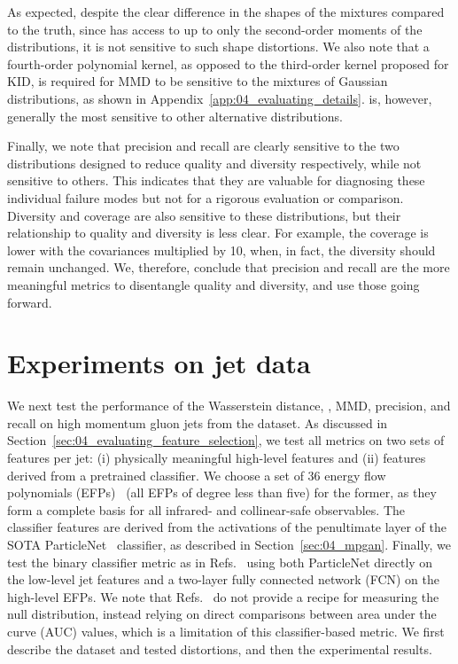 As expected, despite the clear difference in the shapes of the mixtures compared to the truth, since \fgdinf has access to up to only the second-order moments of the distributions, it is not sensitive to such shape distortions.
We also note that a fourth-order polynomial kernel, as opposed to the third-order kernel proposed for KID, is required for MMD to be sensitive to the mixtures of Gaussian distributions, as shown in Appendix~\ref{app:04_evaluating_details}.
\fgdinf is, however, generally the most sensitive to other alternative distributions.

Finally, we note that precision and recall are clearly sensitive to the two distributions designed to reduce quality and diversity respectively, while not sensitive to others.
This indicates that they are valuable for diagnosing these individual failure modes but not for a rigorous evaluation or comparison. 
Diversity and coverage are also sensitive to these distributions, but their relationship to quality and diversity is less clear.
For example, the coverage is lower with the covariances multiplied by 10, when, in fact, the diversity should remain unchanged.
We, therefore, conclude that precision and recall are the more meaningful metrics to disentangle quality and diversity, and use those going forward.

\section{Experiments on jet data}
\label{sec:04_evaluating_jetdata} 

We next test the performance of the Wasserstein distance, \fgdinf, MMD, precision, and recall on high momentum gluon jets from the \jetnet dataset.
As discussed in Section~\ref{sec:04_evaluating_feature_selection}, we test all metrics on two sets of features per jet: (i) physically meaningful high-level features and (ii) features derived from a pretrained classifier.
We choose a set of 36 energy flow polynomials (EFPs)~\cite{Komiske:2017aww} (all EFPs of degree less than five) for the former, as they form a complete basis for all infrared- and collinear-safe observables.
The classifier features are derived from the activations of the penultimate layer of the SOTA ParticleNet~\cite{Qu:2019gqs} classifier, as described in Section~\ref{sec:04_mpgan}.
Finally, we test the binary classifier metric as in Refs.~\cite{krause_caloflow, calochallenge} using both ParticleNet directly on the low-level jet features and a two-layer fully connected network (FCN) on the high-level EFPs.
We note that Refs.~\cite{krause_caloflow, calochallenge} do not provide a recipe for measuring the null distribution, instead relying on direct comparisons between area under the curve (AUC) values, which is a limitation of this classifier-based metric.
We first describe the dataset and tested distortions, and then the experimental results.

